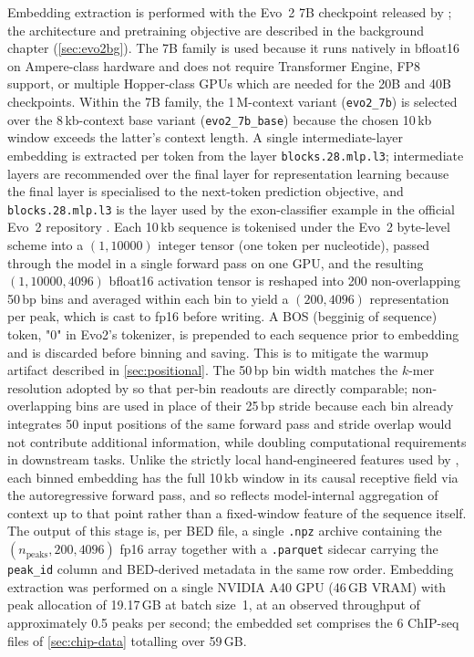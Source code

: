 Embedding extraction is performed with the Evo~2 7B checkpoint released by \citet{brixiGenomeModellingDesign2026}; the architecture and pretraining objective are described in the background chapter (\ref{sec:evo2bg}).
The 7B family is used because it runs natively in bfloat16 on Ampere-class hardware and does not require Transformer Engine, FP8 support, or multiple Hopper-class GPUs which are needed for the 20B and 40B checkpoints.
Within the 7B family, the 1\,M-context variant (\texttt{evo2\_7b}) is selected over the 8\,kb-context base variant (\texttt{evo2\_7b\_base}) because the chosen 10\,kb window exceeds the latter's context length.
A single intermediate-layer embedding is extracted per token from the layer \texttt{blocks.28.mlp.l3}; intermediate layers are recommended over the final layer for representation learning because the final layer is specialised to the next-token prediction objective, and \texttt{blocks.28.mlp.l3} is the layer used by the exon-classifier example in the official Evo~2 repository \cite{brixiGenomeModellingDesign2026}.
Each 10\,kb sequence is tokenised under the Evo~2 byte-level scheme into a $(1, 10000)$ integer tensor (one token per nucleotide), passed through the model in a single forward pass on one GPU, and the resulting $(1, 10000, 4096)$ bfloat16 activation tensor is reshaped into 200 non-overlapping 50\,bp bins and averaged within each bin to yield a $(200, 4096)$ representation per peak, which is cast to fp16 before writing. A BOS (begginig of sequence) token, "0" in Evo2's tokenizer, is prepended to each sequence prior to embedding and is discarded before binning and saving. This is to mitigate the warmup artifact described in \ref{sec:positional}.
The 50\,bp bin width matches the $k$-mer resolution adopted by \citet{faltejskovaNonconsensusFlankingSequence2026a} so that per-bin readouts are directly comparable; non-overlapping bins are used in place of their 25\,bp stride because each bin already integrates 50 input positions of the same forward pass and stride overlap would not contribute additional information, while doubling computational requirements in downstream tasks.
Unlike the strictly local hand-engineered features used by \citet{faltejskovaNonconsensusFlankingSequence2026a}, each binned embedding has the full 10\,kb window in its causal receptive field via the autoregressive forward pass, and so reflects model-internal aggregation of context up to that point rather than a fixed-window feature of the sequence itself.
The output of this stage is, per BED file, a single \texttt{.npz} archive containing the $(n_\text{peaks}, 200, 4096)$ fp16 array together with a \texttt{.parquet} sidecar carrying the \texttt{peak\_id} column and BED-derived metadata in the same row order.
Embedding extraction was performed on a single NVIDIA A40 GPU (46\,GB VRAM) with peak allocation of 19.17\,GB at batch size~1, at an observed throughput of approximately 0.5 peaks per second; the embedded set comprises the 6 ChIP-seq files of \ref{sec:chip-data} totalling over 59\,GB. %

